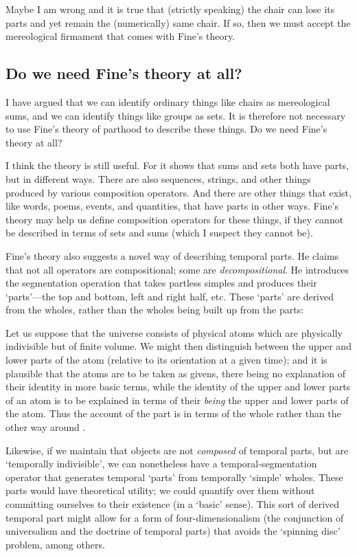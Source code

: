 \documentclass[11pt]{article}
\newenvironment{squote}{%
\begin{spacing}{1}
\begin{list}{}{%
\setlength{\labelwidth}{0pt}%
\rightmargin\leftmargin%
}
\item\relax
}{%
\end{list}%
\end{spacing}
}
\begin{document}
\begin{spacing}{1.5}
Maybe I am wrong and it is true that (strictly speaking) the chair can
lose its parts and yet remain the (numerically) same chair.  If so,
then we must accept the mereological firmament that comes with Fine's
theory.

\subsection{Do we need Fine's theory at all?}
I have argued that we can identify ordinary things like chairs as
mereological sums, and we can identify things like groups as sets.  It
is therefore not necessary to use Fine's theory of parthood to
describe these things.  Do we need Fine's theory at all?

I think the theory is still useful.  For it shows that sums and sets
both have parts, but in different ways.  There are also sequences,
strings, and other things produced by various composition operators.
And there are other things that exist, like words, poems, events, and
quantities, that have parts in other ways.  Fine's theory may help us
define composition operators for these things, if they cannot be
described in terms of sets and sums (which I suspect they cannot be).

Fine's theory also suggests a novel way of describing temporal parts.
He claims that not all operators are compositional; some are {\em
  decompositional}.  He introduces the segmentation operation that
takes partless simples and produces their `parts'---the top and
bottom, left and right half, etc.  These `parts' are derived from the
wholes, rather than the wholes being built up from the parts:

\begin{squote}
Let us suppose that the universe consists of physical atoms which are
physically indivisible but of finite volume.  We might then
distinguish between the upper and lower parts of the atom (relative to
its orientation at a given time); and it is plausible that the atoms
are to be taken as givens, there being no explanation of their
identity in more basic terms, while the identity of the upper and
lower parts of an atom is to be explained in terms of their {\em
  being} the upper and lower parts of the atom.  Thus the account of
the part is in terms of the whole rather than the other way around
\citep[585]{fine2010}.
\end{squote}

Likewise, if we maintain that objects are not {\em composed} of
temporal parts, but are `temporally indivisible', we can nonetheless
have a temporal-segmentation operator that generates temporal `parts'
from temporally `simple' wholes.  These parts would have theoretical
utility; we could quantify over them without committing ourselves to
their existence (in a `basic' sense).  This sort of derived temporal
part might allow for a form of four-dimensionalism (the conjunction of
universalism and the doctrine of temporal parts) that avoids the
`spinning disc' problem, among others.


\end{spacing}
\end{document}
